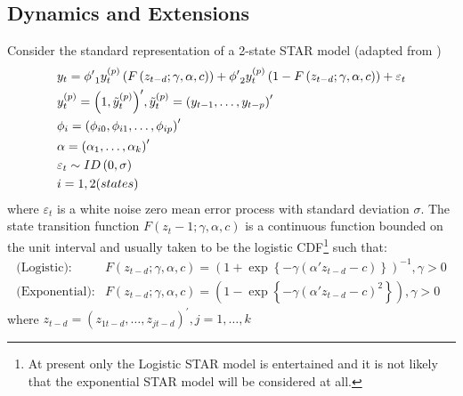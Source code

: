 \subsection{Dynamics and Extensions}
Consider the standard representation of a 2-state STAR model (adapted from
\cite{Dijk1999})
\begin{equation}\label{eq:star_original}
\begin{gathered}
  {y_t} = {{\phi '}_1}y_t^{\left( p \right)}\left( {F\left( {{z_{t - d}};\gamma ,\alpha ,c} \right)} \right) + {{\phi '}_2}y_t^{\left( p \right)}\left( {1 - F\left( {{z_{t - d}};\gamma ,\alpha ,c} \right)} \right) + {\varepsilon _t} \hfill \\
  y_t^{\left( p \right)} = {\left( {1,\tilde y_t^{\left( p \right)}} \right)^\prime },\tilde y_t^{\left( p \right)} = {\left( {{y_{t - 1}}, \ldots ,{y_{t - p}}} \right)^\prime } \hfill \\
  {\phi _i} = {\left( {{\phi _{i0}},{\phi _{i1}}, \ldots ,{\phi _{ip}}} \right)^\prime } \hfill \\
  \alpha  = {\left( {{\alpha _1}, \ldots ,{\alpha _k}} \right)^\prime }\hfill \\
  {\varepsilon _t} \sim ID\left( {0,\sigma } \right) \hfill \\
  i = 1,2(states) \hfill \\
\end{gathered}
\end{equation}
where $\varepsilon_t$ is a white noise zero mean error process with standard
deviation $\sigma$. The state transition function $F\left( {{z_t-1};\gamma
,\alpha ,c} \right)$ is a continuous function bounded on the unit interval and 
usually taken to be the logistic CDF\footnote{At present only the Logistic STAR 
model is entertained and it is not likely that the exponential STAR model will
be  considered at all.} such that:
\begin{equation}\label{eq:logistic_cdf}
\begin{split}
\text{(Logistic):} &F\left( {{z_{t-d}};\gamma ,\alpha ,c} \right) = {\left( {1 + \exp \left\{ { -
\gamma \left( {\alpha '{z_{t-d}} - c} \right)} \right\}} \right)}^{ - 1},\gamma  > 0\\
\text{(Exponential):}&F\left( {{z_{t-d}};\gamma ,\alpha ,c} \right) = {\left( {1 - \exp \left\{ { -
\gamma \left( {\alpha '{z_{t-d}} - c} \right)}^2 \right\}} \right)},\gamma  > 0
\end{split}
\end{equation}
where ${z_{t-d}} = {\left( {{z_{1{t-d}}},\dots,{z_{j{t-d}}}} \right)^\prime },j = 1,\dots,k$
